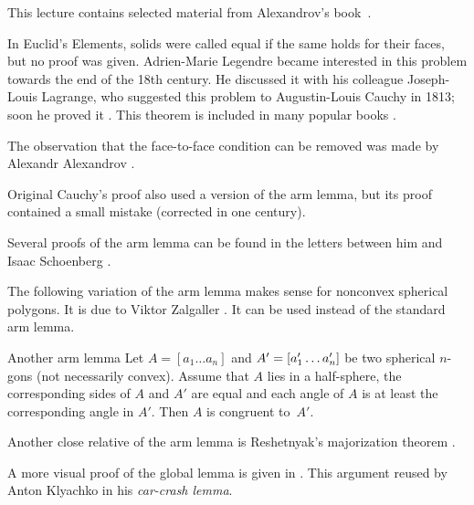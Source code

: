 This lecture contains selected material from Alexandrov's book~\cite{alexandrov}.

In Euclid's Elements, 
solids were called equal if the same holds for their faces, but no proof was given.
Adrien-Marie Legendre became interested in this problem towards the end of the 18th century.
He discussed it with his colleague Joseph-Louis Lagrange, who suggested this problem to Augustin-Louis Cauchy in 1813; soon he proved it \cite{cauchy}.
This theorem is included in many popular books \cite{aigner-zigler,dolbilin,tabacnikov-fuks}.

The observation that the face-to-face condition can be removed was made by 
Alexandr Alexandrov \cite{alexandrov-1941}.

Original Cauchy's proof \cite{cauchy}
also used a version of the arm lemma, but its proof contained a small mistake (corrected in one century).

Several proofs of the arm lemma can be found in the letters between him and Isaac Schoenberg \cite{schoenberg-zaremba}.

The following variation of the arm lemma makes sense for nonconvex spherical polygons.
It is due to Viktor Zalgaller \cite{zalgaller}.
It can be used instead of the standard arm lemma.

\begin{thm}{Another arm lemma}
Let $A=[a_1\dots a_n]$ and $A'=[a'_1\dots a'_n]$ be two spherical $n$-gons (not necessarily convex).
Assume that $A$ lies in a half-sphere,
the corresponding sides of $A$ and $A'$ are equal
and each angle of $A$ is at least the corresponding angle in $A'$.
Then $A$ is congruent to~$A'$. 
\end{thm}

Another close relative of the arm lemma is Reshetnyak's majorization theorem \cite{alexander-kapovitch-petrunin-2019}.

A more visual proof of the global lemma is given in \cite[II \S 1.3]{alexandrov}.
This argument reused by Anton Klyachko \cite{klyachko} in his \emph{car-crash lemma}.
